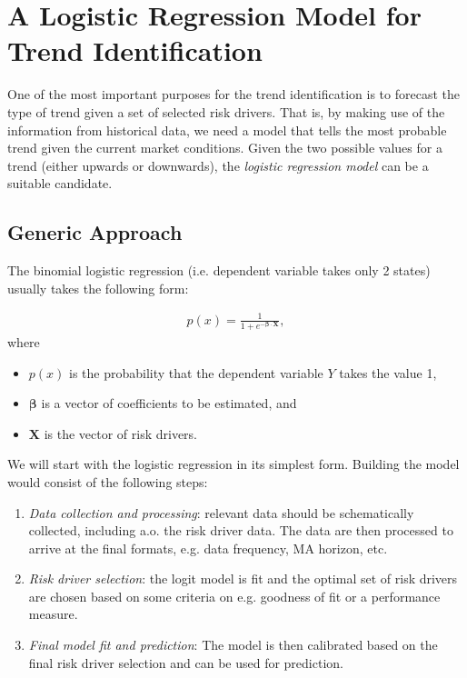 
\chapter{A Logistic Regression Model for Trend Identification}

One of the most important purposes for the trend identification is to forecast the type of trend given a set of selected risk drivers. That is, by making use of the information from historical data, we need a model that tells the most probable trend given the current market conditions. Given the two possible values for a trend (either upwards or downwards), the \textit{logistic regression model} can be a suitable candidate. 

\section{Generic Approach}

The binomial logistic regression (i.e. dependent variable takes only 2 states) usually takes the following form: 

\begin{align*}
	p(x) = \frac{1}{1+e^{-\mathbf{\beta}\cdot\mathbf{X}}}, 
\end{align*}
where
\begin{itemize}
	\item $p(x)$ is the probability that the dependent variable $Y$ takes the value 1, 
	\item $\mathbf{\beta}$ is a vector of coefficients to be estimated, and
	\item $\mathbf{X}$ is the vector of risk drivers. 
\end{itemize}

We will start with the logistic regression in its simplest form. Building the model would consist of the following steps: 
\begin{enumerate}
	\item \textit{Data collection and processing}: relevant data should be schematically collected, including a.o. the risk driver data. The data are then processed to arrive at the final formats, e.g. data frequency, MA horizon, etc. 
	\item \textit{Risk driver selection}: the logit model is fit and the optimal set of risk drivers are chosen based on some criteria on e.g. goodness of fit or a performance measure. 
	\item \textit{Final model fit and prediction}: The model is then calibrated based on the final risk driver selection and can be used for prediction. 
\end{enumerate} 


